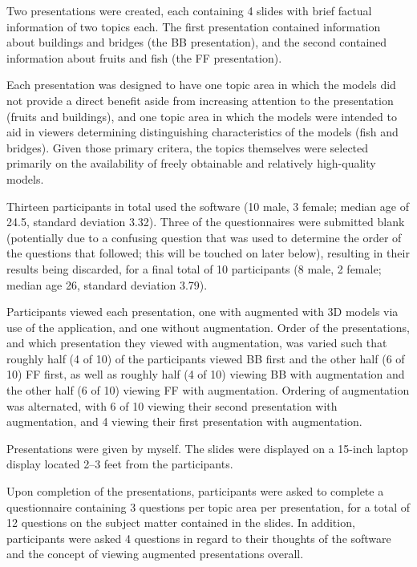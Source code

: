 \documentclass[10pt,journal]{IEEEtran}
\begin{document}
Two presentations were created, each containing 4 slides with brief factual
information of two topics each. The first presentation contained information
about buildings and bridges (the \textsc{BB} presentation), and the second
contained information about fruits and fish (the \textsc{FF} presentation).

Each presentation was designed to have one topic area in which the models did
not provide a direct benefit aside from increasing attention to the
presentation (fruits and buildings), and one topic area in which the models
were intended to aid in viewers determining distinguishing characteristics of
the models (fish and bridges). Given those primary critera, the topics
themselves were selected primarily on the availability of freely obtainable and
relatively high-quality models.

Thirteen participants in total used the software (10 male, 3 female; median age
of 24.5, standard deviation 3.32). Three of the questionnaires were submitted
blank (potentially due to a confusing question that was used to determine the
order of the questions that followed; this will be touched on later below),
resulting in their results being discarded, for a final total of 10
participants (8 male, 2 female; median age 26, standard deviation 3.79).

Participants viewed each presentation, one with augmented with 3D models via
use of the application, and one without augmentation. Order of the
presentations, and which presentation they viewed with augmentation, was varied
such that roughly half (4 of 10) of the participants viewed \textsc{BB} first
and the other half (6 of 10) \textsc{FF} first, as well as roughly half (4 of
10) viewing \textsc{BB} with augmentation and the other half (6 of 10) viewing
\textsc{FF} with augmentation. Ordering of augmentation was alternated, with 6
of 10 viewing their second presentation with augmentation, and 4 viewing their
first presentation with augmentation.

Presentations were given by myself. The slides were displayed on a 15-inch
laptop display located 2--3 feet from the participants.

Upon completion of the presentations, participants were asked to complete a
questionnaire containing 3 questions per topic area per presentation, for a
total of 12 questions on the subject matter contained in the slides. In
addition, participants were asked 4 questions in regard to their thoughts of
the software and the concept of viewing augmented presentations overall.
\end{document}
